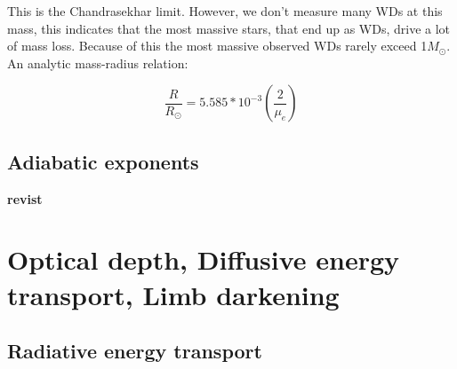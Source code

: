 \documentclass{article}
\begin{document}
This is the Chandrasekhar limit. However, we don't measure many WDs at this mass, this indicates that the most massive stars, that end up as WDs, drive a lot of mass loss. Because of this the most massive observed WDs rarely exceed 1$M_\odot$. An analytic mass-radius relation:

\begin{equation}
    \frac{R}{R_\odot} = 5.585*10^{-3}\left(\frac{2}{\mu_e}\right)
\end{equation}

\subsection{Adiabatic exponents}

\textbf{revist}

\section{Optical depth, Diffusive energy transport, Limb darkening}

\subsection{Radiative energy transport}
\end{document}
